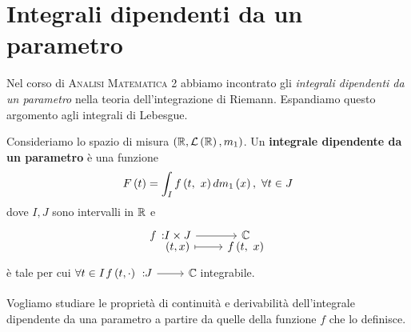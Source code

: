 \section{Integrali dipendenti da un parametro}
Nel corso di \textsc{Analisi Matematica 2} abbiamo incontrato gli \textit{integrali dipendenti da un parametro} nella teoria dell'integrazione di Riemann. Espandiamo questo argomento agli integrali di Lebesgue.
\begin{define}
	Consideriamo lo spazio di misura $\left(\mathbb{R},\mathcal{L}\left(\mathbb{R}\right),m_1\right)$. Un \textbf{integrale dipendente da un parametro} è una funzione
	\begin{equation}
		F\left(t\right)=\int_I\mvf{f}{t}{x}dm_1\left(x\right),\ \forall t\in J
	\end{equation}
	dove $I,J$ sono intervalli in $\mathbb{R}$ e
	\begin{equation*}
		\funztot{f}{I\times J}{\complexset}{\left(t,x\right)}{\mvf{f}{t}{x}}
	\end{equation*}
	è tale per cui $\forall t\in I\ \funz{f\left(t,\cdot\right)}{J}{\complexset}$ integrabile.
\end{define}
Vogliamo studiare le proprietà di continuità e derivabilità dell'integrale dipendente da una parametro a partire da quelle della funzione $f$ che lo definisce.
